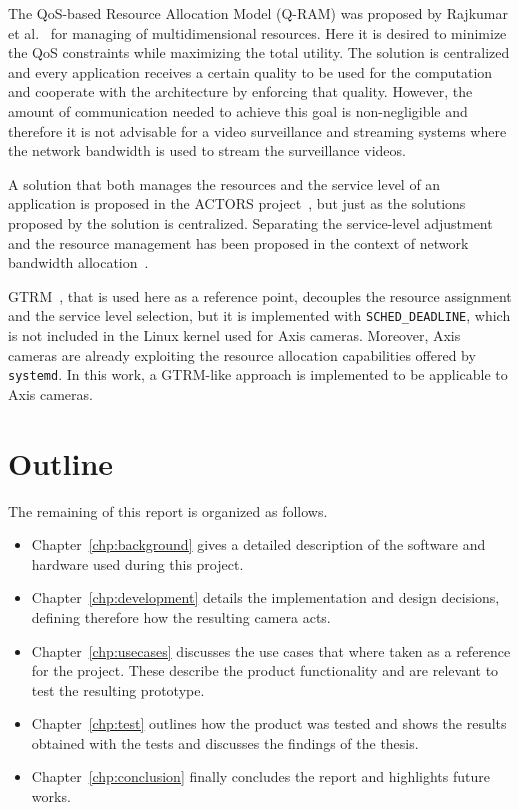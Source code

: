 \documentclass[nobiblatex]{LTHthesis}
\begin{document}
The QoS-based Resource Allocation Model (Q-RAM) was proposed by Rajkumar et 
al.~\cite{Raj97a} for managing of multidimensional resources. Here it is 
desired to minimize the QoS constraints while maximizing the total 
utility. The solution is centralized and every application receives a
certain quality to be used for the computation and cooperate with the
architecture by enforcing that quality. However, the amount of communication
needed to achieve this goal is non-negligible and therefore it is not
advisable for a video surveillance and streaming systems where the network
bandwidth is used to stream the surveillance videos.
 
A solution that both manages the resources and the service level of an 
application is proposed in the ACTORS project~\cite{Bin11}, but just as the 
solutions proposed by \cite{Raj97a,Soj11,Arz11} the solution is centralized. 
Separating the service-level adjustment and the resource management has been proposed in the context of network bandwidth allocation~\cite{Sil11}.

GTRM~\cite{gtrm}, that is used here as a reference point, decouples the
resource assignment and the service level selection, but it is implemented
with \texttt{SCHED\_DEADLINE}, which is not included in the Linux kernel
used for Axis cameras. Moreover, Axis cameras are already exploiting the
resource allocation capabilities offered by \texttt{systemd}. In this
work, a GTRM-like approach is implemented to be applicable to Axis cameras.

\section{Outline}

The remaining of this report is organized as follows.

\begin{itemize}
\item Chapter~\ref{chp:background} gives a detailed description of
  the software and hardware used during this project.



\item Chapter~\ref{chp:development} details the implementation and design
  decisions, defining therefore how the resulting camera acts.
\item Chapter~\ref{chp:usecases} discusses the use cases that where
  taken as a reference for the project. These describe the product
  functionality and are relevant to test the resulting prototype.
\item Chapter~\ref{chp:test} outlines how the product was tested and shows the results obtained with the tests and discusses the findings of the thesis.
\item Chapter~\ref{chp:conclusion} finally concludes the report and
  highlights future works.
\end{itemize}
\end{document}
